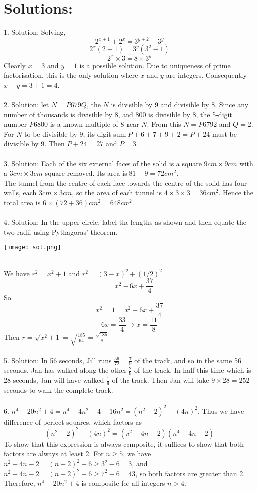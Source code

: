 \documentclass{article}
\begin{document}
\newpage
\section{Solutions:}
1. Solution: Solving, $$2^{x+1}+2^x=3^{y+2}-3^y$$ $$2^x(2+1)=3^y(3^2-1)$$ $$2^x \times 3 = 8 \times 3^y$$ Clearly $x=3$ and $y=1$ is a possible solution. Due to uniqueness of prime factorisation, this is the only solution where $x$ and $y$ are integers. Consequently $x+y = 3+1=4$. \\\\ 
2. Solution: let $N = P679Q$, the $N$ is divisible by 9 and divisible by $8$. Since any number of thousands is divisible by 8, and 800 is divisible by 8, the 5-digit number $P6800$ is a known multiple of 8 near $N$. From this $N = P6792$ and $Q=2$. \\ For $N$ to be divisible by $9$, its digit sum $P+6+7+9+2=P+24$ must be divisible by 9. Then $P+24=27$ and $P=3$. \\\\
3. Solution: Each of the six external faces of the solid is a square $9cm \times 9cm$ with a $3cm \times 3cm$ square removed. Its area is $81-9=72cm^2$. \\ The tunnel from the centre of each face towards the centre of the solid has four walls, each $3cm \times 3cm$, so the area of each tunnel is $4 \times 3 \times 3 = 36 cm^2$. Hence the total area is $6 \times (72+36) cm^2 = 648 cm^2$. \\\\
4. Solution: In the upper circle, label the lengths as shown and then equate the two radii using Pythagoras' theorem. \\
\centerline{\texttt{[image: sol.png]}} \\ We have $r^2=x^2+1$ and $r^2=(3-x)^2+(1/2)^2$ $$=x^2-6x+\frac{37}{4}$$ So $$x^2=1=x^2-6x+\frac{37}{4}$$ $$6x=\frac{33}{4} \rightarrow x=\frac{11}{8} $$  Then $r=\sqrt{x^2+1}=\sqrt{\frac{185}{64}}=\frac{\sqrt{185}}{8}$ \\\\
5. Solution: In 56 seconds, Jill runs $\frac{56}{72}=\frac{7}{9}$ of the track, and so in the same 56 seconds, Jan has walked along the other $\frac{2}{9}$ of the track. In half this time which is $28$ seconds, Jan will have walked $\frac{1}{9}$ of the track. Then Jan will take $9 \times 28 = 252$ seconds to walk the complete track. \\\\
6. $n^4-20n^2+4=n^4-4n^2+4-16n^2=(n^2-2)^2-(4n)^2$, Thus we have difference of perfect squares, which factors as $$(n^2-2)^2-(4n)^2=(n^2-4n-2)(n^4+4n-2)$$ To show that this expression is always composite, it suffices to show that both factors are always at least 2. For $n\ge 5$, we have $n^2-4n-2=(n-2)^2-6 \ge 3^2-6=3$, and $n^2+4n-2=(n+2)^2-6 \ge 7^2-6=43$, so both factors are greater than 2. Therefore, $n^4-20n^2+4$ is composite for all integers $n > 4$. \\\\
\end{document}
